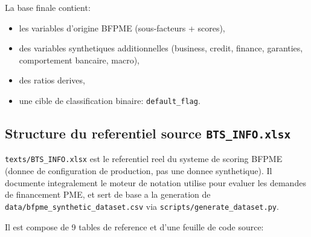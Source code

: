 \documentclass[11pt,a4paper]{article}
\begin{document}
La base finale contient:
\begin{itemize}[leftmargin=1.2cm]
  \item les variables d'origine BFPME (sous-facteurs + scores),
  \item des variables synthetiques additionnelles (business, credit, finance, garanties, comportement bancaire, macro),
  \item des ratios derives,
  \item une cible de classification binaire: \texttt{default\_flag}.
\end{itemize}

\subsection{Structure du referentiel source \texttt{BTS\_INFO.xlsx}}

\texttt{texts/BTS\_INFO.xlsx} est le referentiel reel du systeme de scoring BFPME (donnee de configuration de production, pas une donnee synthetique). Il documente integralement le moteur de notation utilise pour evaluer les demandes de financement PME, et sert de base a la generation de \texttt{data/bfpme\_synthetic\_dataset.csv} via \texttt{scripts/generate\_dataset.py}.

Il est compose de 9 tables de reference et d'une feuille de code source:
\end{document}
